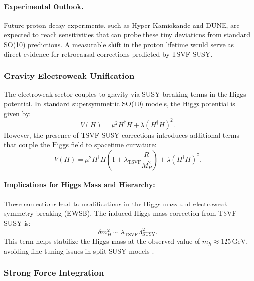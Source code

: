 \documentclass[twocolumn,superscriptaddress,floatfix]{revtex4-2}
\begin{document}
\paragraph{Experimental Outlook.}
Future proton decay experiments, such as Hyper-Kamiokande and DUNE, are expected to reach sensitivities that can probe these tiny deviations from standard SO(10) predictions. A measurable shift in the proton lifetime would serve as direct evidence for retrocausal corrections predicted by TSVF-SUSY.


\subsubsection{Gravity-Electroweak Unification}
\label{subsec:ew_unification}

The electroweak sector couples to gravity via SUSY-breaking terms in the Higgs potential. In standard supersymmetric SO(10) models, the Higgs potential is given by:
\begin{equation}  
V(H) = \mu^2 H^\dagger H + \lambda (H^\dagger H)^2.  
\label{eq:higgs_potential_standard}
\end{equation}
However, the presence of TSVF-SUSY corrections introduces additional terms that couple the Higgs field to spacetime curvature:
\begin{equation}  
V(H) = \mu^2 H^\dagger H \left(1 + \lambda_{\text{TSVF}} \frac{R}{M_P^2}\right) + \lambda (H^\dagger H)^2.  
\label{eq:higgs_potential_tsvf}
\end{equation}

\paragraph{Implications for Higgs Mass and Hierarchy:} 
These corrections lead to modifications in the Higgs mass and electroweak symmetry breaking (EWSB). The induced Higgs mass correction from TSVF-SUSY is:
\begin{equation}
\delta m_H^2 \sim \lambda_{\text{TSVF}} \Lambda_{\text{SUSY}}^2.
\label{eq:higgs_mass_correction}
\end{equation}
This term helps stabilize the Higgs mass at the observed value of \( m_h \approx 125 \, \text{GeV} \), avoiding fine-tuning issues in split SUSY models \cite{ArkaniHamed2005}. 


\subsubsection{Strong Force Integration}
\label{subsec:strong_force}
\end{document}

